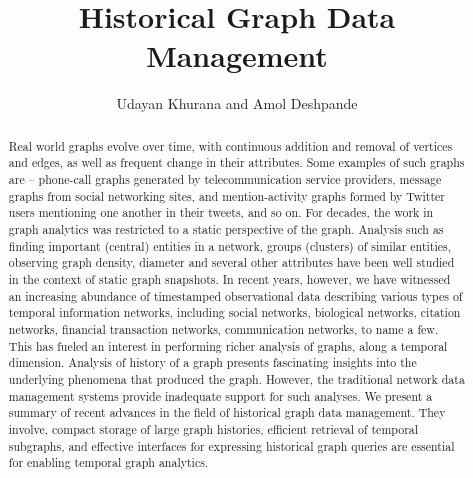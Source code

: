 \documentclass{svjour3}
\begin{document}
\title{Historical Graph Data Management}
\author{Udayan Khurana and Amol Deshpande}
%
%
\maketitle

\begin{abstract}

Real world graphs evolve over time, with continuous addition and removal of vertices and edges, as well as frequent change in their attributes. Some examples of such graphs are -- phone-call graphs generated by telecommunication service providers, message graphs from social networking sites, and mention-activity graphs formed by Twitter users mentioning one another in their tweets, and so on.
For decades, the work in graph analytics was restricted to a static perspective of the graph. Analysis such as finding important (central) entities in a network, groups (clusters) of similar entities, observing graph density, diameter and several other attributes have been well studied in the context of static graph snapshots. 
In recent years, however, we have witnessed an increasing abundance of timestamped observational data describing
various types of temporal information networks, including social networks, biological networks,
citation networks, financial transaction networks, communication networks, to
name a few. This has fueled an interest in performing richer analysis of graphs, along a temporal dimension. Analysis of history of a graph presents fascinating insights into the underlying phenomena that produced the graph. 
However, the traditional network data management systems provide inadequate support for such analyses. We present a summary of recent advances in the field of historical graph data management. They involve, compact storage of large graph histories, efficient retrieval of temporal subgraphs, and effective interfaces for expressing historical graph queries are essential for enabling temporal graph analytics.  
\end{abstract}
\end{document}
